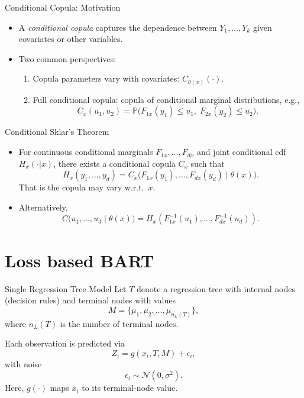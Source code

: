 \documentclass[11pt]{beamer}
\newcommand{\Prob}{\mathbb{P}}
\begin{document}
    \begin{frame}{Conditional Copula: Motivation}
    \begin{itemize}
    \item A \emph{conditional copula} captures the dependence between $Y_1,\dots,Y_k$ given covariates or other variables.
    \item Two common perspectives:
    \begin{enumerate}
    \item Copula parameters vary with covariates: $C_{\theta(x)}(\cdot)$.
    \item Full conditional copula: copula of conditional marginal distributions, e.g.,
    \[ C_{x}(u_1,u_2)=\Prob\big(F_{1x}(y_1)\le u_1,\; F_{2x}(y_2)\le u_2 \big). \]
    \end{enumerate}
    \end{itemize}
    \end{frame}

    \begin{frame}{Conditional Sklar's Theorem}
    \begin{itemize}
        \item For continuous conditional marginals $F_{1x},\dots,F_{dx}$ and joint conditional cdf $H_{x}(\cdot|x)$,
    there exists a conditional copula $C_{x}$ such that
    \[ H_{x}(y_1,\dots,y_d) = C_{x}\big( F_{1x}(y_1),\dots, F_{dx}(y_d) \mid \theta(x)\big). \]
    That is the copula may vary w.r.t.~$x$.
    \item Alternatively,
    \[ C\big( u_1,\dots, u_d \mid \theta(x)\big) = H_{x}(F^{-1}_{1x}(u_1),\dots,F^{-1}_{dx}(u_d)). \]
    \end{itemize}
    \end{frame}
    
    \section{Loss based BART}

    \begin{frame}{Single Regression Tree Model}
    Let $T$ denote a regression tree with internal nodes (decision rules) and terminal nodes with values 
    \[
    M = \{\mu_1, \mu_2, \dots, \mu_{n_L(T)}\},
    \]
    where $n_L(T)$ is the number of terminal nodes.
    
    
    Each observation is predicted via
    \[
    Z_i = g(x_i, T, M) + \epsilon_i,
    \]
    with noise
    \[
    \epsilon_i \sim \mathcal{N}(0, \sigma^2).
    \]
    Here, $g(\cdot)$ maps $x_i$ to its terminal-node value.
    \end{frame}
    
\end{document}
